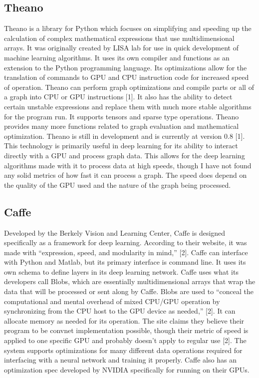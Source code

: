 \subsection{Theano}
Theano is a library for Python which focuses on simplifying and speeding up the calculation of complex mathematical expressions that use multidimensional arrays. 
It was originally created by LISA lab for use in quick development of machine learning algorithms.
It uses its own compiler and functions as an extension to the Python programming language. 
Its optimizations allow for the translation of commands to GPU and CPU instruction code for increased speed of operation.
Theano can perform graph optimizations and compile parts or all of a graph into CPU or GPU instructions [1]. 
It also has the ability to detect certain unstable expressions and replace them with much more stable algorithms for the program run.
It supports tensors and sparse type operations. 
Theano provides many more functions related to graph evaluation and mathematical optimization. 
Theano is still in development and is currently at version 0.8 [1]. 
This technology is primarily useful in deep learning for its ability to interact directly with a GPU and process graph data. 
This allows for the deep learning algorithms made with it to process data at high speeds, though I have not found any solid metrics of how fast it can process a graph. 
The speed does depend on the quality of the GPU used and the nature of the graph being processed.

\subsection{Caffe}
Developed by the Berkely Vision and Learning Center, Caffe is designed specifically as a framework for deep learning. 
According to their website, it was made with “expression, speed, and modularity in mind,” [2]. 
Caffe can interface with Python and Matlab, but its primary interface is command line. 
It uses its own schema to define layers in its deep learning network.
Caffe uses what its developers call Blobs, which are essentially multidimensional arrays that wrap the data that will be processed or sent along by Caffe. 
Blobs are used to “conceal the computational and mental overhead of mixed CPU/GPU operation by synchronizing from the CPU host to the GPU device as needed,” [2]. 
It can allocate memory as needed for its operation.
The site claims they believe their program to be convnet implementation possible, though their metric of speed is applied to one specific GPU and probably doesn't apply to regular use [2]. 
The system supports optimizations for many different data operations required for interfacing with a neural network and training it properly.
Caffe also has an optimization spec developed by NVIDIA specifically for running on their GPUs.


